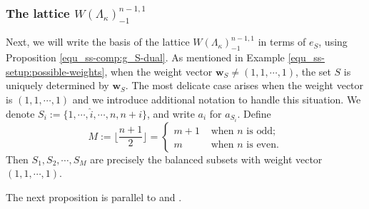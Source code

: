\documentclass[pdflatex,sn-mathphys-num]{sn-jnl}%
\theoremstyle{thmstyleone}%
\theoremstyle{thmstyletwo}%
\numberwithin{equation}{subsection}
\theoremstyle{thmstylethree}%
\newcommand{\bw}{\ensuremath{\mathbf{w}}\xspace}
\newcommand{\wh}{\widehat}
\begin{document}
\subsubsection{The lattice $W(\Lambda_\kappa)_{-1}^{n-1,1}$}
Next, we will write the basis of the lattice $W(\Lambda_\kappa)_{-1}^{n-1,1}$ in terms of $e_S$, using Proposition \ref{equ_ss-comp:g_S-dual}.
As mentioned in Example \ref{equ_ss-setup:possible-weights}, when the weight vector $\bw_S\neq (1,1,\cdots,1)$, the set $S$ is uniquely determined by $\bw_S$. 
The most delicate case arises when the weight vector is $(1,1,\cdots,1)$ and we introduce additional notation to handle this situation.
We denote $S_i:=\{1,\cdots,\wh{i},\cdots,n,n+i\}$, and write $a_i$ for $a_{S_i}$. Define
\begin{equation*}
	M:=\lfloor \frac{n+1}{2}\rfloor=\left\{\begin{array}{cc} m+1 & \mbox{ when }n\mbox{ is odd};\\ m & \mbox{ when }n\mbox{ is even}.\end{array}\right.
\end{equation*}
Then $S_1,S_2,\cdots, S_M$ are precisely the balanced subsets with weight vector $(1,1,\cdots,1)$.
		
The next proposition is parallel to \cite[Proposition 4.12]{Smithling2015} and \cite[Proposition 2]{Yu2019}.
		
\end{document}
